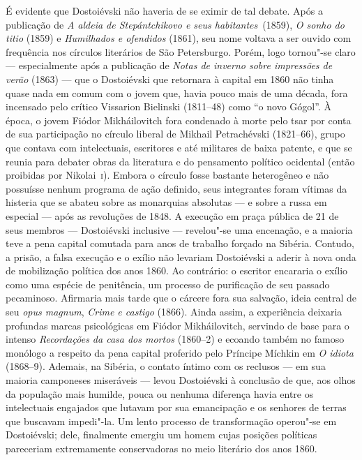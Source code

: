 É evidente que Dostoiévski não haveria de se eximir de tal debate. Após a
publicação de \textit{A aldeia de Stepántchikovo e seus habitantes}~(1859),
\textit{O sonho do titio} (1859) e \textit{Humilhados e ofendidos} (1861), seu
nome voltava a ser ouvido com frequência nos círculos literários de São
Petersburgo. Porém, logo tornou"-se claro --- especialmente após a publicação de
\textit{Notas de inverno sobre impressões de verão} (1863) --- que o Dostoiévski
que retornara à capital em 1860 não tinha quase nada em comum com o jovem que,
havia pouco mais de uma década, fora incensado pelo crítico Vissarion Bielinski
(1811--48) como “o novo Gógol”. À época, o jovem Fiódor Mikháilovitch fora
condenado à morte pelo tsar por conta de sua participação no círculo liberal de
Mikhail Petrachévski (1821--66), grupo que contava com intelectuais, escritores
e até militares de baixa patente, e que se reunia para debater obras da
literatura e do pensamento político ocidental (então proibidas por Nikolai~\textsc{i}).
Embora o círculo fosse bastante heterogêneo e não possuísse nenhum programa de
ação definido, seus integrantes foram vítimas da histeria que se abateu sobre as
monarquias absolutas --- e sobre a russa em especial --- após as revoluções de
1848. A execução em praça pública de 21 de seus membros --- Dostoiévski
inclusive --- revelou"-se uma encenação, e a maioria teve a pena capital comutada
para anos de trabalho forçado na Sibéria.  Contudo, a prisão, a falsa
execução e o exílio não levariam Dostoiévski a aderir à nova onda de
mobilização política dos anos 1860. Ao contrário: o escritor encararia o exílio
como uma espécie de penitência, um processo de purificação de seu passado
pecaminoso. Afirmaria mais tarde que o cárcere fora sua salvação, ideia central
de seu \textit{opus magnum}, \textit{Crime e castigo} (1866). Ainda assim, a
experiência deixaria profundas marcas psicológicas em Fiódor Mikháilovitch,
servindo de base para o intenso \textit{Recordações da casa dos mortos}
(1860--2) e ecoando também no famoso monólogo a respeito da pena capital
proferido pelo Príncipe Míchkin em \textit{O idiota} (1868--9). Ademais, na
Sibéria, o contato íntimo com os reclusos --- em sua maioria camponeses
miseráveis --- levou Dostoiévski à conclusão de que, aos olhos da população mais
humilde, pouca ou nenhuma diferença havia entre os intelectuais engajados que
lutavam por sua emancipação e os senhores de terras que buscavam impedi"-la. Um
lento processo de transformação operou"-se em Dostoiévski; dele, finalmente
emergiu um homem cujas posições políticas pareceriam extremamente conservadoras
no meio literário dos anos 1860.

